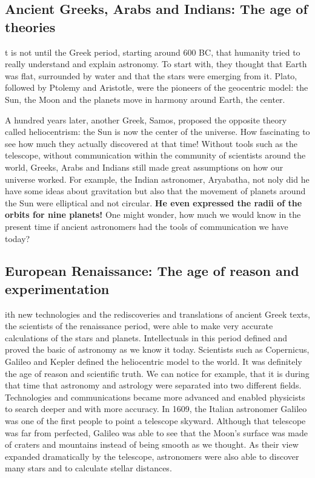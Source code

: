 \subsection{Ancient Greeks, Arabs and Indians: The age of theories}
t is not until the Greek period, starting around 600 BC, that humanity tried to really understand and explain astronomy. 
To start with, they thought that Earth was flat, surrounded by water and that the stars were emerging from it.
Plato, followed by Ptolemy and Aristotle, were the pioneers of the geocentric model: the Sun, the Moon and the planets move in harmony around Earth, the center.

A hundred years later, another Greek, Samos, proposed the opposite theory called heliocentrism: the Sun is now the center of the universe.
How fascinating to see how much they actually discovered at that time!  
Without tools such as the telescope, without communication within the community of scientists around the world, Greeks, Arabs and Indians still made great assumptions on how our universe worked. 
For example, the Indian astronomer, Aryabatha, not noly did he have some ideas about gravitation but also that the movement of planets around the Sun were elliptical and not circular. 
\textbf{He even expressed the radii of the orbits for nine planets!}
One might wonder, how much we would know in the present time if ancient astronomers had the tools of communication we have today?
\cite{GreekAstro}
\cite{Aryabatha}

\subsection{European Renaissance: The age of reason and experimentation}
ith new technologies and the rediscoveries and translations of ancient Greek texts, the scientists of the renaissance period, were able to make very accurate calculations of the stars and planets.
Intellectuals in this period defined and proved the basic of astronomy as we know it today.  
Scientists such as Copernicus, Galileo and Kepler defined the heliocentric model to the world. 
It was definitely the age of reason and scientific truth. 
We can notice for example, that it is during that time that astronomy and astrology were separated into two different fields. 
Technologies and communications became more advanced and enabled physicists to search deeper and with more accuracy. 
In 1609, the Italian astronomer Galileo was one of the first people to point a telescope skyward. 
Although that telescope was far from perfected, Galileo was able to see that the Moon's surface was made of craters and mountains instead of being smooth as we thought.
As their view expanded dramatically by the telescope, astronomers were also able to discover many stars and to calculate stellar distances.
\cite{GalileoTelescope}

